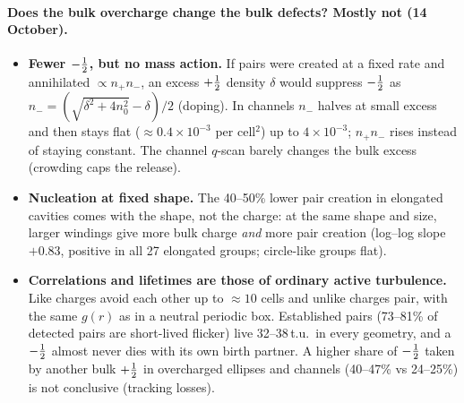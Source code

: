 \paragraph{Does the bulk overcharge change the bulk defects? Mostly not (14 October).}
\begin{itemize}
  \item \textbf{Fewer $-\tfrac12$, but no mass action.} If pairs were created at a fixed rate and annihilated $\propto n_+n_-$, an excess $+\tfrac12$ density $\delta$ would suppress $-\tfrac12$
        as $n_-=(\sqrt{\delta^2+4n_0^2}-\delta)/2$ (doping). In channels $n_-$ halves at small excess and then stays flat ($\approx0.4\times10^{-3}$ per cell$^2$) up to $4\times10^{-3}$;
        $n_+n_-$ rises instead of staying constant. The channel $q$-scan barely changes the bulk excess (crowding caps the release).
  \item \textbf{Nucleation at fixed shape.} The 40--50\% lower pair creation in elongated cavities comes with the shape, not the charge: at the same shape and size, larger windings give more
        bulk charge \emph{and} more pair creation (log--log slope $+0.83$, positive in all 27 elongated groups; circle-like groups flat).
  \item \textbf{Correlations and lifetimes are those of ordinary active turbulence.} Like charges avoid each other up to $\approx10$ cells and unlike charges pair, with the same $g(r)$ as in a
        neutral periodic box. Established pairs (73--81\% of detected pairs are short-lived flicker) live 32--38\,t.u.\ in every geometry, and a $-\tfrac12$ almost never dies with its own
        birth partner. A higher share of $-\tfrac12$ taken by another bulk $+\tfrac12$ in overcharged ellipses and channels (40--47\% vs 24--25\%) is not conclusive (tracking losses).
\end{itemize}

